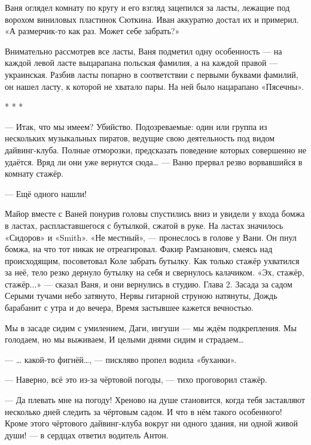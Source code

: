 Ваня оглядел комнату по кругу и его взгляд зацепился за ласты, лежащие под ворохом виниловых пластинок Сюткина. Иван аккуратно достал их и примерил. «А размерчик-то как раз. Может себе забрать?»


Внимательно рассмотрев все ласты, Ваня подметил одну особенность --- на каждой левой ласте выцарапана польская фамилия, а на каждой правой --- украинская. Разбив ласты попарно в соответствии с первыми буквами фамилий, он нашел ласту, к которой не хватало пары. На ней было нацарапано «Пясечны».


\begin{center}* * *\end{center}



--- Итак, что мы имеем? Убийство. Подозреваемые: один или группа из нескольких музыкальных пиратов, ведущие свою деятельность под видом дайвинг-клуба. Полные отморозки, предсказать поведение которых совершенно не удаётся. Вряд ли они уже вернутся сюда… --- Ваню прервал резво ворвавшийся в комнату стажёр.

--- Ещё одного нашли!


Майор вместе с Ваней понурив головы спустились вниз и увидели у входа бомжа в ластах, распластавшегося с бутылкой, сжатой в руке. На ластах значилось «Сидоров» и «Smith». «Не местный», --- пронеслось в голове у Вани. Он пнул бомжа, на что тот никак не отреагировал. Факир Рамзанович, смеясь над происходящим, посоветовал Коле забрать бутылку. Как только стажёр ухватился за неё, тело резко дернуло бутылку на себя и свернулось калачиком. «Эх, стажёр, стажёр...» --- сказал Ваня, и они вернулись в студию.
Глава 2. Засада за садом
Серыми тучами небо затянуто,
Нервы гитарной струною натянуты,
Дождь барабанит с утра и до вечера,
Время застывшее кажется вечностью.


Мы в засаде сидим с умилением,
Даги, ингуши --- мы ждём подкрепления.
Мы голодаем, но мы выживаем,
И целыми днями сидим и страдаем…



--- … какой-то фигнёй…, --- пискляво пропел водила «буханки». 

--- Наверно, всё это из-за чёртовой погоды, --- тихо проговорил стажёр.

--- Да плевать мне на погоду! Хреново на душе становится, когда тебя заставляют несколько дней следить за чёртовым садом. И что в нём такого особенного! Кроме этого чёртового дайвинг-клуба вокруг ни одного здания, ни одной живой души! --- в сердцах ответил водитель Антон.

